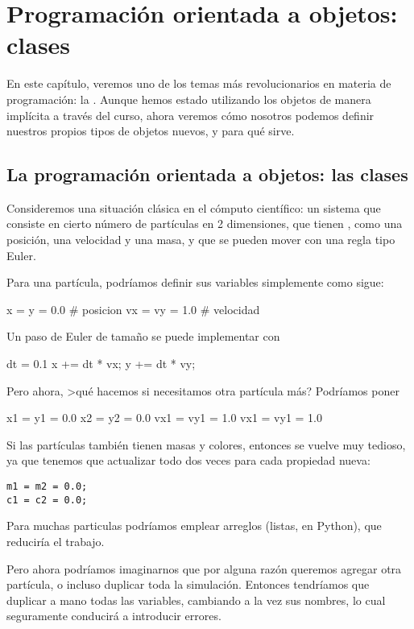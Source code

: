 \chapter{Programación orientada a objetos: clases}

En este capítulo, veremos uno de los temas más revolucionarios en materia de programación: la . Aunque hemos estado utilizando los objetos de manera implícita a través del curso, ahora veremos cómo nosotros podemos definir nuestros propios tipos de objetos nuevos, y para qué sirve.

\section{La programación orientada a objetos: las clases}

Consideremos una situación clásica en el cómputo científico: un sistema que consiste en cierto número de partículas en 2 dimensiones, que tienen , como una posición, una velocidad y una masa, y que se pueden mover con una regla tipo Euler.

Para una partícula, podríamos definir sus variables simplemente como sigue:
\begin{python}
x = y = 0.0    # posicion
vx =  vy = 1.0  # velocidad
\end{python}
Un paso de Euler de tamaño  se puede implementar con
\begin{python}
dt = 0.1
x += dt * vx;
y += dt * vy;
\end{python}


Pero ahora, >qué hacemos si necesitamos otra partícula más? Podríamos poner
\begin{python}
x1 = y1 = 0.0
x2 = y2 = 0.0
vx1 = vy1 = 1.0
vx1 = vy1 = 1.0
\end{python}
Si las partículas también tienen masas y colores, entonces se vuelve muy tedioso, ya que tenemos que actualizar todo dos veces para cada propiedad nueva:
\begin{lstlisting}
m1 = m2 = 0.0;
c1 = c2 = 0.0;
\end{lstlisting}
Para muchas particulas podríamos emplear arreglos (listas, en Python), que reduciría el trabajo.

Pero ahora podríamos imaginarnos que por alguna razón queremos  agregar otra partícula, o incluso duplicar toda la simulación.
  Entonces tendríamos que duplicar a mano todas las variables, cambiando a la vez sus nombres, lo cual
seguramente conducirá a introducir  errores.

